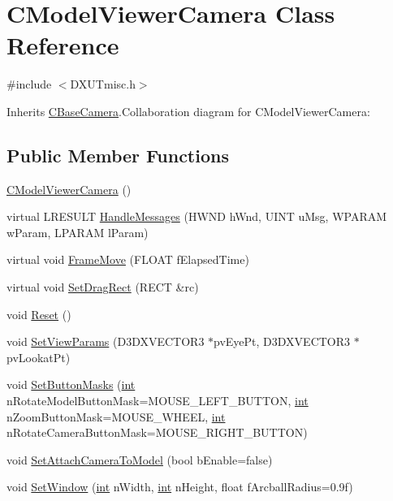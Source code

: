 \hypertarget{class_c_model_viewer_camera}{
\section{CModelViewerCamera Class Reference}
\label{class_c_model_viewer_camera}
}


{\ttfamily \#include $<$DXUTmisc.h$>$}

Inherits \hyperlink{class_c_base_camera}{CBaseCamera}.Collaboration diagram for CModelViewerCamera:\subsection*{Public Member Functions}
\begin{DoxyCompactItemize}
\item 
\hyperlink{class_c_model_viewer_camera_a6e6f27ab21440758f97e0069a14a41a1}{CModelViewerCamera} ()
\item 
virtual LRESULT \hyperlink{class_c_model_viewer_camera_ad50f3bd74420f1ee3c0b6ca9ac3ec348}{HandleMessages} (HWND hWnd, UINT uMsg, WPARAM wParam, LPARAM lParam)
\item 
virtual void \hyperlink{class_c_model_viewer_camera_a5309ad1ff0044124c05737da466b7315}{FrameMove} (FLOAT fElapsedTime)
\item 
virtual void \hyperlink{class_c_model_viewer_camera_aecba47f0c48401639138f602d3ed28bd}{SetDragRect} (RECT \&rc)
\item 
void \hyperlink{class_c_model_viewer_camera_a64f3b265b831578d24faadec70f9dc1b}{Reset} ()
\item 
void \hyperlink{class_c_model_viewer_camera_a3cfc3e0fd350457b4206054c96fc39f7}{SetViewParams} (D3DXVECTOR3 $\ast$pvEyePt, D3DXVECTOR3 $\ast$pvLookatPt)
\item 
void \hyperlink{class_c_model_viewer_camera_a999c8bce2cb411f5b674a81f230dff96}{SetButtonMasks} (\hyperlink{_d_x_u_tgui_8cpp_a2d77ed03302b6978834ee3b6f57837fb}{int} nRotateModelButtonMask=MOUSE\_\-LEFT\_\-BUTTON, \hyperlink{_d_x_u_tgui_8cpp_a2d77ed03302b6978834ee3b6f57837fb}{int} nZoomButtonMask=MOUSE\_\-WHEEL, \hyperlink{_d_x_u_tgui_8cpp_a2d77ed03302b6978834ee3b6f57837fb}{int} nRotateCameraButtonMask=MOUSE\_\-RIGHT\_\-BUTTON)
\item 
void \hyperlink{class_c_model_viewer_camera_acb49faefb46c891fcbf9f96529d96c19}{SetAttachCameraToModel} (bool bEnable=false)
\item 
void \hyperlink{class_c_model_viewer_camera_aa3602c760615115aa606cc3dfe9675fc}{SetWindow} (\hyperlink{_d_x_u_tgui_8cpp_a2d77ed03302b6978834ee3b6f57837fb}{int} nWidth, \hyperlink{_d_x_u_tgui_8cpp_a2d77ed03302b6978834ee3b6f57837fb}{int} nHeight, float fArcballRadius=0.9f)

\end{DoxyCompactItemize}
